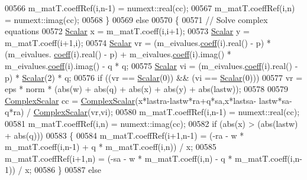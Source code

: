 \begin{DoxyCode}
00566             m\_matT.coeffRef(i,n-1) = numext::real(cc);
00567             m\_matT.coeffRef(i,n) = numext::imag(cc);
00568           \}
00569           \textcolor{keywordflow}{else}
00570           \{
00571             \textcolor{comment}{// Solve complex equations}
00572             \hyperlink{group___eigenvalues___module_a017d49fe0d59874b70a2fcf35e5aa373}{Scalar} x = m\_matT.coeff(i,i+1);
00573             \hyperlink{group___eigenvalues___module_a017d49fe0d59874b70a2fcf35e5aa373}{Scalar} y = m\_matT.coeff(i+1,i);
00574             \hyperlink{group___eigenvalues___module_a017d49fe0d59874b70a2fcf35e5aa373}{Scalar} vr = (m\_eivalues.\hyperlink{class_eigen_1_1_plain_object_base_afbfc12954f16d21aedb7bd839f64a278}{coeff}(i).real() - p) * (m\_eivalues.
      \hyperlink{class_eigen_1_1_plain_object_base_afbfc12954f16d21aedb7bd839f64a278}{coeff}(i).real() - p) + m\_eivalues.\hyperlink{class_eigen_1_1_plain_object_base_afbfc12954f16d21aedb7bd839f64a278}{coeff}(i).imag() * m\_eivalues.\hyperlink{class_eigen_1_1_plain_object_base_afbfc12954f16d21aedb7bd839f64a278}{coeff}(i).imag() - q * q;
00575             \hyperlink{group___eigenvalues___module_a017d49fe0d59874b70a2fcf35e5aa373}{Scalar} vi = (m\_eivalues.\hyperlink{class_eigen_1_1_plain_object_base_afbfc12954f16d21aedb7bd839f64a278}{coeff}(i).real() - p) * \hyperlink{group___eigenvalues___module_a017d49fe0d59874b70a2fcf35e5aa373}{Scalar}(2) * q;
00576             \textcolor{keywordflow}{if} ((vr == \hyperlink{group___eigenvalues___module_a017d49fe0d59874b70a2fcf35e5aa373}{Scalar}(0)) && (vi == \hyperlink{group___eigenvalues___module_a017d49fe0d59874b70a2fcf35e5aa373}{Scalar}(0)))
00577               vr = eps * norm * (abs(w) + abs(q) + abs(x) + abs(y) + abs(lastw));
00578 
00579             \hyperlink{group___eigenvalues___module_a4d0b2a773357d0a6ec98e026f04002ed}{ComplexScalar} cc = \hyperlink{group___eigenvalues___module_a4d0b2a773357d0a6ec98e026f04002ed}{ComplexScalar}(x*lastra-lastw*ra+q*sa,x*lastsa-
      lastw*sa-q*ra) / \hyperlink{group___eigenvalues___module_a4d0b2a773357d0a6ec98e026f04002ed}{ComplexScalar}(vr,vi);
00580             m\_matT.coeffRef(i,n-1) = numext::real(cc);
00581             m\_matT.coeffRef(i,n) = numext::imag(cc);
00582             \textcolor{keywordflow}{if} (abs(x) > (abs(lastw) + abs(q)))
00583             \{
00584               m\_matT.coeffRef(i+1,n-1) = (-ra - w * m\_matT.coeff(i,n-1) + q * m\_matT.coeff(i,n)) / x;
00585               m\_matT.coeffRef(i+1,n) = (-sa - w * m\_matT.coeff(i,n) - q * m\_matT.coeff(i,n-1)) / x;
00586             \}
00587             \textcolor{keywordflow}{else}

\end{DoxyCode}

